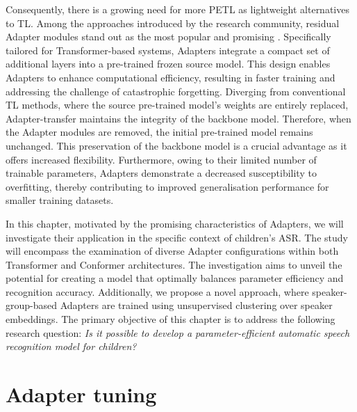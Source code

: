 Consequently, there is a growing need for more \ac{PETL} as lightweight alternatives to \ac{TL}. Among the approaches introduced by the research community, residual Adapter modules stand out as the most popular and promising \cite{houlsby, pfeiffer}. Specifically tailored for Transformer-based systems, Adapters integrate a compact set of additional layers into a pre-trained frozen source model. This design enables Adapters to enhance computational efficiency, resulting in faster training and addressing the challenge of catastrophic forgetting. Diverging from conventional \ac{TL} methods, where the source pre-trained model's weights are entirely replaced, Adapter-transfer maintains the integrity of the backbone model. Therefore, when the Adapter modules are removed, the initial pre-trained model remains unchanged. This preservation of the backbone model is a crucial advantage as it offers increased flexibility. Furthermore, owing to their limited number of trainable parameters, Adapters demonstrate a decreased susceptibility to overfitting, thereby contributing to improved generalisation performance for smaller training datasets.

 In this chapter, motivated by the promising characteristics of Adapters, we will investigate their application in the specific context of children's \ac{ASR}. The study will encompass the examination of diverse Adapter configurations within both Transformer and Conformer architectures. The investigation aims to unveil the potential for creating a model that optimally balances parameter efficiency and recognition accuracy. Additionally, we propose a novel approach, where speaker-group-based Adapters are trained using unsupervised clustering over speaker embeddings.
The primary objective of this chapter is to address the following research question: \textit{Is it possible to develop a parameter-efficient automatic speech recognition model for children?} 

\section{Adapter tuning}


